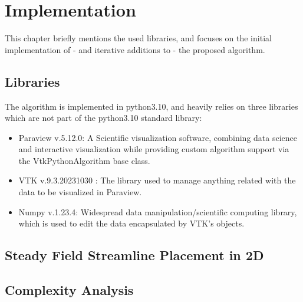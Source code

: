 \chapter{Implementation}
This chapter briefly mentions the used libraries, and focuses on the initial implementation of - and iterative additions to - the proposed algorithm.
\section{Libraries}
The algorithm is implemented in python3.10, and heavily relies on three libraries which are not part of the python3.10 standard library:
\begin{itemize}
    \item Paraview v.5.12.0: A Scientific visualization software, combining data science and interactive visualization while providing custom algorithm support via the VtkPythonAlgorithm base class.
    \item VTK v.9.3.20231030 : The library used to manage anything related with the data to be visualized in Paraview.
    \item Numpy v.1.23.4: Widespread data manipulation/scientific computing library, which is used to edit the data encapsulated by VTK's objects.
\end{itemize}

\section{Steady Field Streamline Placement in 2D}
\section{Complexity Analysis}
